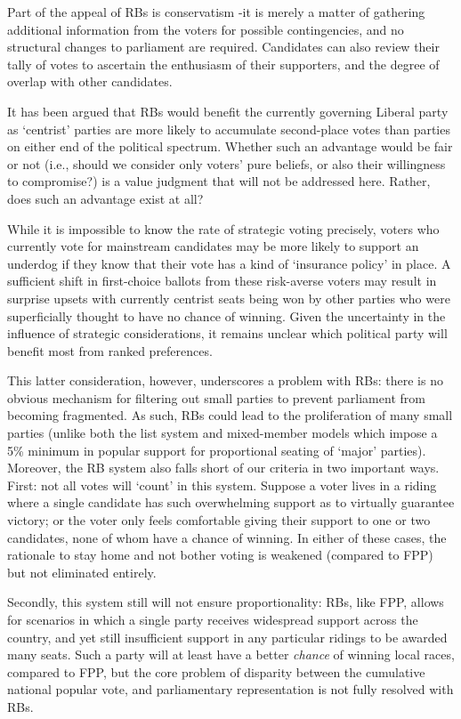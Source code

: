 \documentclass[DIV=calc, paper=a4, fontsize=11pt, twocolumn]{scrartcl}	 %
\begin{document}
Part of the appeal of RBs is conservatism \--it is merely a matter of gathering additional information from the voters for possible contingencies, and no structural changes to parliament are required. Candidates can also review their tally of votes to ascertain the enthusiasm of their supporters, and the degree of overlap with other candidates. 

It has been argued\cite{Record} that RBs would benefit the currently governing Liberal party as `centrist' parties are more likely to accumulate second-place votes than parties on either end of the political spectrum. 
Whether such an advantage would be fair or not (i.e., should we consider only voters' pure beliefs, or also their willingness to compromise?) is a value judgment that will not be addressed here. Rather, does such an advantage exist at all?

While it is impossible to know the rate of strategic voting precisely, voters who currently vote for mainstream candidates may be more likely to support an underdog if they know that their vote has a kind of `insurance policy' in place. 
A sufficient shift in first-choice ballots from these risk-averse voters may result in surprise upsets with currently centrist seats being won by other parties who were superficially thought to have no chance of winning. 
Given the uncertainty in the influence of strategic considerations, it remains  unclear which political party will benefit most from ranked preferences. 

This latter consideration, however, underscores a problem with RBs:  there is no obvious mechanism for filtering out small parties to prevent parliament from becoming fragmented. As such, RBs could lead to the proliferation of many small parties
(unlike both the list system and  mixed-member models which impose a 5\% minimum in popular support for proportional seating of `major' parties). 
Moreover, the RB system also falls short of our criteria in two important ways.
First: not all votes will `count' in this system. 
Suppose a voter lives in a riding where a single candidate has such overwhelming support as to virtually guarantee victory; or the voter only feels comfortable giving their support to one or two candidates, none of whom have a chance of winning. 
In either of these cases, the rationale to stay home and not bother voting is weakened (compared to FPP) but not eliminated entirely. 

Secondly, this system still will not ensure proportionality: RBs, like FPP, allows for scenarios in which a single party receives widespread support across the country, and yet still insufficient support in any particular ridings to be awarded many seats. Such a party will at least have a better \emph{chance} of winning local races, compared to FPP, but the core problem of disparity between the cumulative national popular vote, and parliamentary representation is not fully resolved with RBs.
\end{document}
